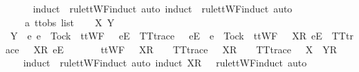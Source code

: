 \begin{isabellebody}
\ \ \ \ \isamarkupfalse%
\ {\isacharparenleft}induct\ {\isasymrho}\ rule{\isacharcolon}ttWF{\isachardot}induct{\isacharcomma}\ auto{\isacharcomma}\ induct\ {\isasymsigma}\ rule{\isacharcolon}ttWF{\isachardot}induct{\isacharcomma}\ auto{\isacharparenright}\isanewline
{}\isamarkupfalse%
\isanewline
\ \ \isamarkupfalse%
\ {\isasymrho}\ {\isasymsigma}\ {\isacharcolon}{\isacharcolon}\ {\isachardoublequoteopen}{\isacharprime}a\ ttobs\ list{\isachardoublequoteclose}\isanewline
\ \ \isamarkupfalse%
\ X\ Y\isanewline
\ \ \isamarkupfalse%
\ {\isachardoublequoteopen}Y\ {\isasyminter}\ {\isacharbraceleft}e{\isachardot}\ e\ {\isasymnoteq}\ Tock\ {\isasymand}\ ttWF\ {\isacharparenleft}{\isasymrho}\ {\isacharat}\ {\isacharbrackleft}{\isacharbrackleft}e{\isacharbrackright}\isactrlsub E{\isacharbrackright}{\isacharparenright}\ {\isasymand}\ TT{}{\isacharunderscore}trace\ {\isacharparenleft}{\isasymrho}\ {\isacharat}\ {\isacharbrackleft}{\isacharbrackleft}e{\isacharbrackright}\isactrlsub E{\isacharbrackright}{\isacharparenright}\ {\isasymor}\ e\ {\isacharequal}\ Tock\ {\isasymand}\ ttWF\ {\isacharparenleft}{\isasymrho}\ {\isacharat}\ {\isacharbrackleft}{\isacharbrackleft}X{\isacharbrackright}\isactrlsub R{\isacharcomma}\ {\isacharbrackleft}e{\isacharbrackright}\isactrlsub E{\isacharbrackright}{\isacharparenright}\ {\isasymand}\ TT{}{\isacharunderscore}trace\ {\isacharparenleft}{\isasymrho}\ {\isacharat}\ {\isacharbrackleft}{\isacharbrackleft}X{\isacharbrackright}\isactrlsub R{\isacharcomma}\ {\isacharbrackleft}e{\isacharbrackright}\isactrlsub E{\isacharbrackright}{\isacharparenright}{\isacharbraceright}\ {\isacharequal}\ {\isacharbraceleft}{\isacharbraceright}\ {\isasymLongrightarrow}\isanewline
\ \ \ \ ttWF\ {\isacharparenleft}{\isasymrho}\ {\isacharat}\ {\isacharbrackleft}X{\isacharbrackright}\isactrlsub R\ {\isacharhash}\ {\isasymsigma}{\isacharparenright}\ {\isasymLongrightarrow}\ TT{}{\isacharunderscore}trace\ {\isacharparenleft}{\isasymrho}\ {\isacharat}\ {\isacharbrackleft}X{\isacharbrackright}\isactrlsub R\ {\isacharhash}\ {\isasymsigma}{\isacharparenright}\ {\isasymLongrightarrow}\ TT{}{\isacharunderscore}trace\ {\isacharparenleft}{\isasymrho}\ {\isacharat}\ {\isacharbrackleft}X\ {\isasymunion}\ Y{\isacharbrackright}\isactrlsub R\ {\isacharhash}\ {\isasymsigma}{\isacharparenright}{\isachardoublequoteclose}\isanewline
\ \ \isamarkupfalse%
\ {\isacharparenleft}induct\ {\isasymrho}\ rule{\isacharcolon}ttWF{\isachardot}induct{\isacharcomma}\ auto{\isacharcomma}\ induct\ {\isachardoublequoteopen}{\isacharbrackleft}X{\isacharbrackright}\isactrlsub R\ {\isacharhash}\ {\isasymsigma}{\isachardoublequoteclose}\ rule{\isacharcolon}ttWF{\isachardot}induct{\isacharcomma}\ auto{\isacharparenright}\isanewline

\end{isabellebody}
